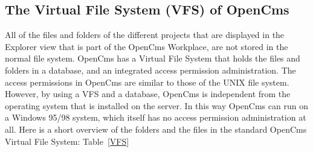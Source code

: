 \subsection{The Virtual File System (VFS) of OpenCms}
All of the files and folders of the different projects that are
displayed in the Explorer view that is part of the OpenCms Workplace,
are not stored in the normal file system. OpenCms has a {\name Virtual File
System} that holds the files and folders in a database, and an integrated
access permission administration. The access permissions in OpenCms are
similar to those of the UNIX file system. However, by using a {\name VFS} and a
database, OpenCms is independent from the operating system that is
installed on the server. In this way OpenCms can run on a Windows 95/98
system, which itself has no access permission administration at all.
Here is a short overview of the folders and the files in the standard
OpenCms {\name Virtual File System:} {Table~\ref {VFS}}

